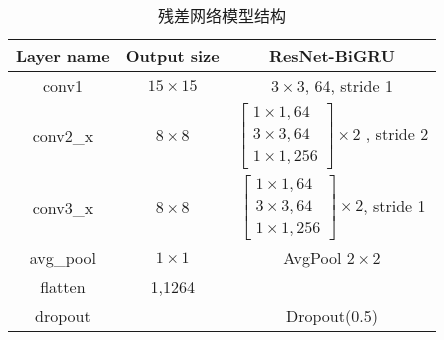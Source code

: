 \begin{table}[h]
	\caption{残差网络模型结构}
	\label{tab:resnet_description}
	\centering
	\begin{tabular}{c|c|c}
		\hline
		Layer name                & Output size                              & ResNet-BiGRU             \\
		\hline
		conv1                     & $15 \times 15$                           & $3\times3$, 64, stride 1 \\
		\hline
		\multirow{4}{*}{conv2\_x} & \multirow{4}{*}{\centering $8 \times 8$} &
		\multirow{4}{*}{$\left[\begin{array}{c}
						1 \times 1, 64 \\
						3 \times 3, 64 \\
						1 \times 1, 256
					\end{array}\right] \times 2$ , stride 2}                  \\
		                          &                                          &                          \\
		                          &                                          &                          \\
		                          &                                          &                          \\
		\hline
		\multirow{4}{*}{conv3\_x} & \multirow{4}{*}{\centering $8 \times 8$} &
		\multirow{4}{*}{$\left[\begin{array}{c}
						1 \times 1, 64 \\
						3 \times 3, 64 \\
						1 \times 1, 256
					\end{array}\right] \times 2$, stride 1}                   \\
		                          &                                          &                          \\
		                          &                                          &                          \\
		                          &                                          &                          \\
		\hline
		avg\_pool                 & $1 \times 1$                             & AvgPool $2 \times 2$     \\
		\hline
		flatten                   & 1,1264                                   &                          \\
		\hline
		dropout                   &                                          & Dropout(0.5)             \\
		\hline
	\end{tabular}
\end{table}


